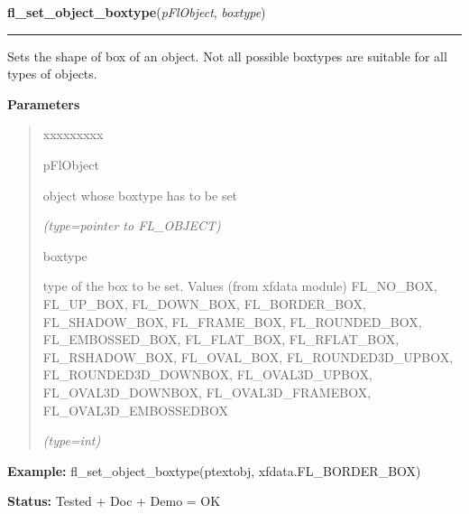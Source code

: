 \hspace{.8\funcindent}\begin{boxedminipage}{\funcwidth}

    \raggedright \textbf{fl\_set\_object\_boxtype}(\textit{pFlObject}, \textit{boxtype})

    \vspace{-1.5ex}

    \rule{\textwidth}{0.5\fboxrule}
\setlength{\parskip}{2ex}
    Sets the shape of box of an object. Not all possible boxtypes are 
    suitable for all types of objects.

\setlength{\parskip}{1ex}
      \textbf{Parameters}
      \vspace{-1ex}

      \begin{quote}
        \begin{Ventry}{xxxxxxxxx}

          \item[pFlObject]

          object whose boxtype has to be set

            {\it (type=pointer to FL\_OBJECT)}

          \item[boxtype]

          type of the box to be set. Values (from xfdata module) 
          FL\_NO\_BOX, FL\_UP\_BOX, FL\_DOWN\_BOX, FL\_BORDER\_BOX, 
          FL\_SHADOW\_BOX, FL\_FRAME\_BOX, FL\_ROUNDED\_BOX, 
          FL\_EMBOSSED\_BOX, FL\_FLAT\_BOX, FL\_RFLAT\_BOX, 
          FL\_RSHADOW\_BOX, FL\_OVAL\_BOX, FL\_ROUNDED3D\_UPBOX, 
          FL\_ROUNDED3D\_DOWNBOX, FL\_OVAL3D\_UPBOX, FL\_OVAL3D\_DOWNBOX, 
          FL\_OVAL3D\_FRAMEBOX, FL\_OVAL3D\_EMBOSSEDBOX

            {\it (type=int)}

        \end{Ventry}

      \end{quote}

\textbf{Example:} fl\_set\_object\_boxtype(ptextobj, xfdata.FL\_BORDER\_BOX)



\textbf{Status:} Tested + Doc + Demo = OK



    \end{boxedminipage}

    \label{xformslib:flbasic:fl_get_object_boxtype}


